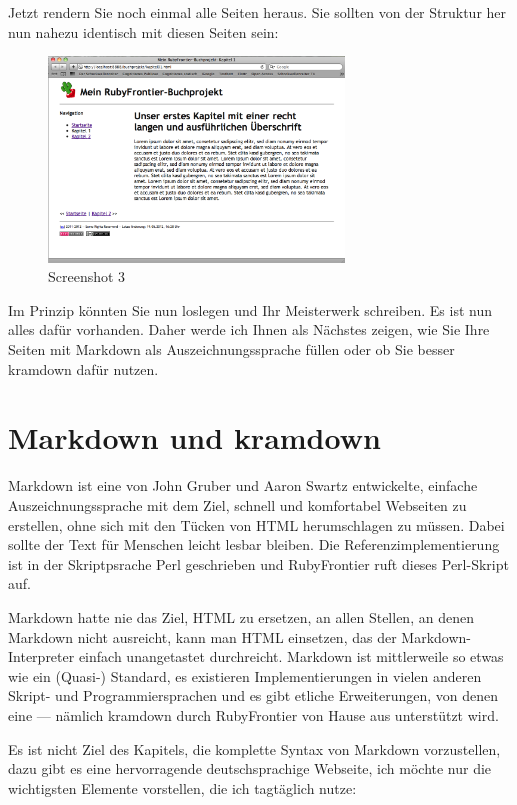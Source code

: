 \documentclass[11pt]{report}
\begin{document}
Jetzt rendern Sie noch einmal alle Seiten heraus. Sie sollten von der
Struktur her nun nahezu identisch mit diesen Seiten sein:

\begin{figure}[h!]
\centering
\includegraphics[width=0.7\textwidth]{./images/buchprojekt03.png}
\caption{\label{buchprojekt03}Screenshot 3}
\end{figure}

Im Prinzip könnten Sie nun loslegen und Ihr Meisterwerk schreiben. Es
ist nun alles dafür vorhanden. Daher werde ich Ihnen als Nächstes
zeigen, wie Sie Ihre Seiten mit Markdown als Auszeichnungssprache
füllen oder ob Sie besser kramdown dafür nutzen.
\chapter{Markdown und kramdown}
\label{sec-2-7}


Markdown ist eine von John Gruber und Aaron Swartz entwickelte,
einfache Auszeichnungssprache mit dem Ziel, schnell und komfortabel
Webseiten zu erstellen, ohne sich mit den Tücken von HTML
herumschlagen zu müssen. Dabei sollte der Text für Menschen leicht
lesbar bleiben. Die Referenzimplementierung ist in der Skriptpsrache
Perl geschrieben und RubyFrontier ruft dieses Perl-Skript auf.


Markdown hatte nie das Ziel, HTML zu ersetzen, an allen Stellen, an
denen Markdown nicht ausreicht, kann man HTML einsetzen, das der
Markdown-Interpreter einfach unangetastet durchreicht. Markdown ist
mittlerweile so etwas wie ein (Quasi-) Standard, es existieren
Implementierungen in vielen anderen Skript- und Programmiersprachen
und es gibt etliche Erweiterungen, von denen eine — nämlich kramdown
durch RubyFrontier von Hause aus unterstützt wird.


Es ist nicht Ziel des Kapitels, die komplette Syntax von Markdown
vorzustellen, dazu gibt es eine hervorragende deutschsprachige
Webseite, ich möchte nur die wichtigsten Elemente vorstellen, die ich
tagtäglich nutze:
\end{document}
